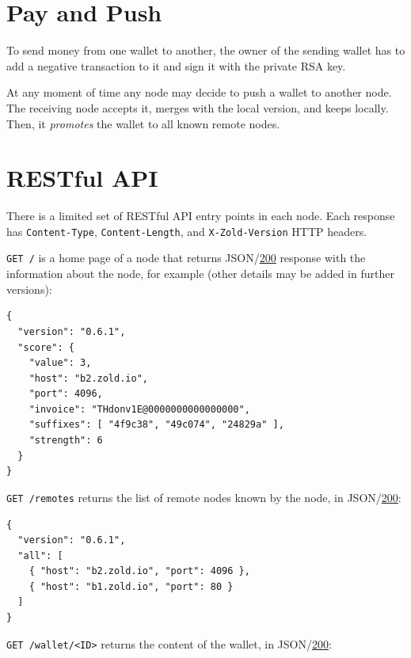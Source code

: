 \documentclass[11pt,oneside]{article}
\newcommand\dd[1]{\colorbox{gray!30}{\texttt{#1}}}
\begin{document}
\section{Pay and Push}

To send money from one wallet to another, the owner of the sending wallet
has to add a negative transaction to it and sign it with the private RSA key.

At any moment of time any node may decide to push a wallet to another node.
The receiving node accepts it, merges with the local version, and keeps locally.
Then, it \emph{promotes} the wallet to all known remote nodes.

\section{RESTful API}

There is a limited set of RESTful API entry points in each node.
Each response has \dd{Content-Type},
\dd{Content-Length}, and \dd{X-Zold-Version}
HTTP headers.

\dd{GET /} is a home page of a node that returns
JSON/\href{https://www.w3.org/Protocols/rfc2616/rfc2616-sec10.html#sec10.2.1}{200}
response with the
information about the node, for example (other details may be added in
further versions):

\begin{verbatim}
{
  "version": "0.6.1",
  "score": {
    "value": 3,
    "host": "b2.zold.io",
    "port": 4096,
    "invoice": "THdonv1E@0000000000000000",
    "suffixes": [ "4f9c38", "49c074", "24829a" ],
    "strength": 6
  }
}
\end{verbatim}

\dd{GET /remotes} returns the list of remote nodes known by the node,
in JSON/\href{https://www.w3.org/Protocols/rfc2616/rfc2616-sec10.html#sec10.2.1}{200}:

\begin{verbatim}
{
  "version": "0.6.1",
  "all": [
    { "host": "b2.zold.io", "port": 4096 },
    { "host": "b1.zold.io", "port": 80 }
  ]
}\end{verbatim}

\dd{GET /wallet/<ID>} returns the content of the wallet, in
JSON/\href{https://www.w3.org/Protocols/rfc2616/rfc2616-sec10.html#sec10.2.1}{200}:
\end{document}
